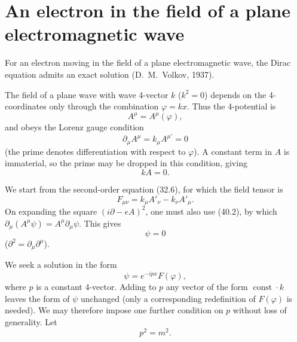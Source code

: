 \section{An electron in the field of a plane electromagnetic wave}

For an electron moving in the field of a plane electromagnetic wave, the Dirac equation admits an exact solution (D.~M.~Volkov, 1937).

The field of a plane wave with wave 4-vector $k$ ($k^2=0$) depends on the 4-coordinates only through the combination $\varphi=kx$. Thus the 4-potential is
\begin{equation}
A^\mu=A^\mu(\varphi),
\tag{40.1}
\end{equation}
and obeys the Lorenz gauge condition
\[
\partial_\mu A^\mu=k_\mu A^{\mu\prime}=0
\]
(the prime denotes differentiation with respect to $\varphi$). A constant term in $A$ is immaterial, so the prime may be dropped in this condition, giving
\begin{equation}
kA=0.
\tag{40.2}
\end{equation}

We start from the second-order equation (32.6), for which the field tensor is
\begin{equation}
F_{\mu\nu}=k_\mu A'_\nu-k_\nu A'_\mu.
\tag{40.3}
\end{equation}
On expanding the square $(i\partial-eA)^2$, one must also use (40.2), by which $\partial_\mu(A^\mu\psi)=A^\mu\partial_\mu\psi$. This gives
\begin{equation}
[-\partial^2-2ie(A\partial)+e^2A^2-m^2-ie(\gamma k)(\gamma A')]\psi=0
\tag{40.4}
\end{equation}
($\partial^2=\partial_\mu\partial^\mu$).

We seek a solution in the form
\begin{equation}
\psi=e^{-ipx}F(\varphi),
\tag{40.5}
\end{equation}
where $p$ is a constant 4-vector. Adding to $p$ any vector of the form $\operatorname{const}\cdot k$ leaves the form of $\psi$ unchanged (only a corresponding redefinition of $F(\varphi)$ is needed). We may therefore impose one further condition on $p$ without loss of generality. Let
\begin{equation}
p^2=m^2.
\tag{40.6}
\end{equation}

